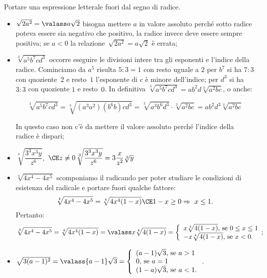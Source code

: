\begin{exrig}
 \begin{esempio}
 Portare una espressione letterale fuori dal segno di radice.
\begin{itemize}
 \item \(\sqrt{2a^2}=\valass a\sqrt 2\) bisogna mettere \(a\) in valore assoluto 
 perché sotto radice poteva essere sia negativo che positivo, la radice invece 
 deve essere sempre positiva; se \(a<0\) la relazione~\(\sqrt{2a^2}=a\sqrt 2\) è 
 errata;
 \item \(\sqrt[3]{a^5b^7cd^3}\) occorre eseguire le divisioni intere tra gli 
 esponenti e l'indice della radice. Cominciamo da \(a^5\) risulta \(5:3 = 1\) con 
 resto uguale a \(2\) per \(b^7\) si ha \(7:3\) con quoziente~\(2\) e resto~\(1\) 
 l'esponente di \(c\) è minore dell'indice; per \(d^3\) si ha \(3:3\) con quoziente 
 \(1\) e resto~\(0\). In definitiva 
 \(\sqrt[3]{a^5b^7cd^3}={ab}^2 d\sqrt[3]{a^2{bc}}\), o anche:
 
\[\sqrt[3]{a^5b^7cd^3}=\sqrt[3]{(a^3a^2)(b^6b)cd^3}=
  \sqrt[3]{a^3b^6d^3}\cdot \sqrt[3]{a^2bc}=ab^2d^3\sqrt[3]{a^2bc}\]
  
In questo caso non c'è da mettere il valore assoluto perché l'indice della 
radice è dispari;
 \item \(\sqrt[3]{\dfrac{3^3x^3y}{z^6}}\),\, 
       \(\CE z\neq 0\,\sqrt[3]{\dfrac{3^3x^3y}{z^6}}=3\dfrac x{z^2}\sqrt[3]y\)
 \item\(\sqrt[4]{4x^4-4x^5}\) 
  scomponiamo il radicando per poter studiare le condizioni di esistenza del 
  radicale e portare fuori qualche fattore: 
  \[\sqrt[4]{4x^4-4x^5}=\sqrt[4]{4x^4(1-x)} \CE 1-x\ge 0\Rightarrow \ x\le 1.\]
  Pertanto:
  \[\sqrt[4]{4x^4-4x^5}=\sqrt[4]{4x^4(1-x)}=\valass x\sqrt[4]{4(1-x)}=
    \left\{\begin{array}{l}
    x\sqrt[4]{4(1-x)}\text{, se }0\le x\le 1\\
    -x\sqrt[4]{4(1-x)}\text{, se }x<0.\end{array};\right.\]
 \item \(\sqrt{3(a-1)^2}=\valass{a-1}\sqrt 3=\left\{\begin{array}{l}
 (a-1)\sqrt 3\text{, se }a>1\\
 0\text{, se }a=1\\
 (1-a)\sqrt 3\text{, se }a<1.\end{array}\right.\).
\end{itemize}
 \end{esempio}
\end{exrig}


